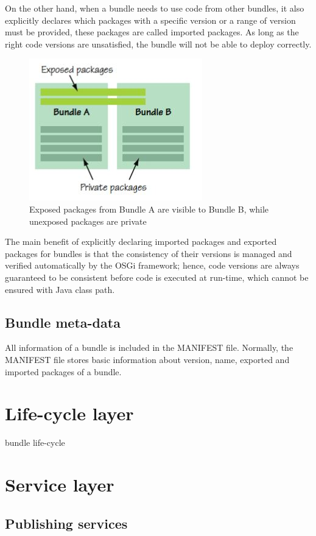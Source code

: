 On the other hand, when a bundle needs to use code from other bundles, it also explicitly declares which packages with a specific version or a range of version must be provided, these packages are called imported packages. As long as the right code versions are unsatisfied, the bundle will not be able to deploy correctly. 
\begin{figure}
	\centering
		\includegraphics{image/packages.JPG}
	\caption{Exposed packages from Bundle A are visible to Bundle B, while unexposed packages are private}
	\label{fig:packages}
\end{figure}

The main benefit of explicitly declaring imported packages and exported packages for bundles is that the consistency of their versions is managed and verified automatically by the OSGi framework; hence, code versions are always guaranteed to be consistent before code is executed at run-time, which cannot be ensured with Java class path.

\subsection{Bundle meta-data}
All information of a bundle is included in the MANIFEST file. Normally, the MANIFEST file stores basic information about version, name, exported and imported packages of a bundle.
    


\section{Life-cycle layer}
bundle life-cycle

\section{Service layer}

\subsection{Publishing services}
